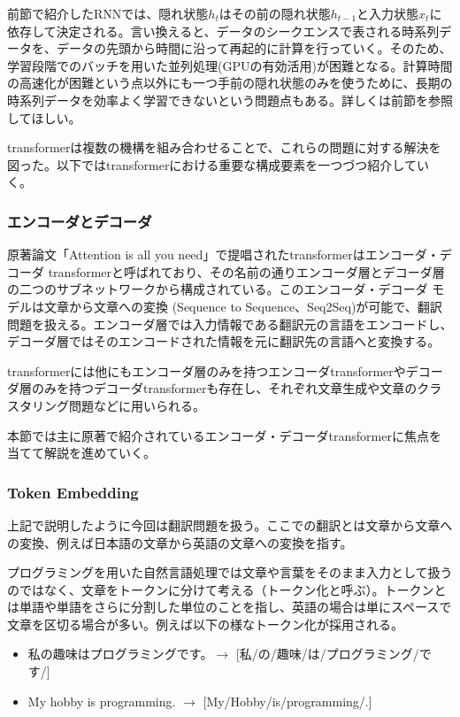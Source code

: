 
前節で紹介したRNNでは、隠れ状態$h_t$はその前の隠れ状態$h_{t-1}$と入力状態$x_t$に依存して決定される。言い換えると、データのシークエンスで表される時系列データを、データの先頭から時間に沿って再起的に計算を行っていく。そのため、学習段階でのバッチを用いた並列処理(GPUの有効活用)が困難となる。計算時間の高速化が困難という点以外にも一つ手前の隠れ状態のみを使うために、長期の時系列データを効率よく学習できないという問題点もある。詳しくは前節を参照してほしい。

transformerは複数の機構を組み合わせることで、これらの問題に対する解決を図った。以下ではtransformerにおける重要な構成要素を一つづつ紹介していく。



\subsubsection{エンコーダとデコーダ}
原著論文「Attention is all you need」で提唱されたtransformerはエンコーダ・デコーダ transformerと呼ばれており、その名前の通りエンコーダ層とデコーダ層の二つのサブネットワークから構成されている。このエンコーダ・デコーダ モデルは文章から文章への変換 (Sequence to Sequence、Seq2Seq)が可能で、翻訳問題を扱える。エンコーダ層では入力情報である翻訳元の言語をエンコードし、デコーダ層ではそのエンコードされた情報を元に翻訳先の言語へと変換する。

transformerには他にもエンコーダ層のみを持つエンコーダtransformerやデコーダ層のみを持つデコーダtransformerも存在し、それぞれ文章生成や文章のクラスタリング問題などに用いられる。

本節では主に原著で紹介されているエンコーダ・デコーダtransformerに焦点を当てて解説を進めていく。


\subsubsection{Token Embedding}
上記で説明したように今回は翻訳問題を扱う。ここでの翻訳とは文章から文章への変換、例えば日本語の文章から英語の文章への変換を指す。

プログラミングを用いた自然言語処理では文章や言葉をそのまま入力として扱うのではなく、文章をトークンに分けて考える（トークン化と呼ぶ）。トークンとは単語や単語をさらに分割した単位のことを指し、英語の場合は単にスペースで文章を区切る場合が多い。例えば以下の様なトークン化が採用される。


\begin{itemize}
\item 私の趣味はプログラミングです。$\rightarrow$ [私/の/趣味/は/プログラミング/です/]
\item My hobby is programming. $\rightarrow$ [My/Hobby/is/programming/.]
\end{itemize}

